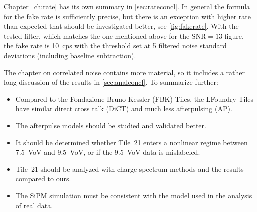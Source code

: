 Chapter~\ref{ch:rate} has its own summary in \autoref{sec:rateconcl}. In
general the formula for the fake rate is sufficiently precise, but there is an
exception with higher rate than expected that should be investigated better,
see \autoref{fig:fakerate}. With the tested filter, which matches the one
mentioned above for the $\mathrm{SNR} = 13$ figure, the fake rate is
\SI{10}{cps} with the threshold set at 5 filtered noise standard deviations
(including baseline subtraction).


The chapter on correlated noise contains more material, so it includes a rather
long discussion of the results in \autoref{sec:analconcl}. To summarize
further:

\begin{itemize}
    
    \item Compared to the Fondazione Bruno Kessler (FBK) Tiles, the LFoundry
    Tiles have similar direct cross talk (DiCT) and much less afterpulsing (AP).
    
    \item The afterpulse models should be studied and validated better.
    
    \item It should be determined whether Tile~21 enters a nonlinear regime
    between \SI{7.5}{VoV} and \SI{9.5}{VoV}, or if the \SI{9.5}{VoV} data is
    mislabeled.
    
    \item Tile~21 should be analyzed with charge spectrum methods and the
    results compared to ours.
    
    \item The SiPM simulation must be consistent with the model used in the
    analysis of real data.
    
\end{itemize}

